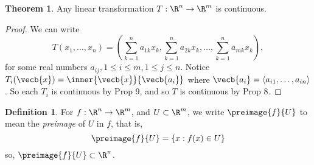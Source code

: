 \documentclass[a5paper]{article}
\theoremstyle{definition}%
\newtheorem{theorem}{Theorem}
\newtheorem*{definition*}{Definition}
\numberwithin{exercise}{section}
\theoremstyle{remark}%
\begin{document}
\begin{highlight}
\begin{theorem}
Any linear transformation $T:\R^n\to\R^m$ is continuous. 
\end{theorem}
\end{highlight}
\begin{proof}
We can write 
$$T(x_1, \ldots , x_n)=\left(\sum_{k=1}^n a_{1k} x_k, \sum_{k=1}^n a_{2k} x_k, \ldots, \sum_{k=1}^n a_{mk} x_k\right),$$
for some real numbers $a_{ij}, 1\leq i\leq m, 1\leq j \leq n$. Notice $T_i(\vecb{x})=\inner{\vecb{x}}{\vecb{a_i}}$ where $\vecb{a_i}=\langle a_{i1}, \ldots, a_{in}\rangle$. So each $T_i$ is continuous by Prop 9, and so $T$ is continuous by Prop 8.
\end{proof}

\begin{definition*}
For $f:\R^n\to\R^m$, and $U\subset \R^m$, we write $\preimage{f}{U}$ to mean the \emph{preimage} of $U$ in $f$, that is, 
$$\preimage{f}{U}=\{x:f(x)\in U\}$$
so, $\preimage{f}{U}\subset \R^n$. 
\end{definition*}
\end{document}
